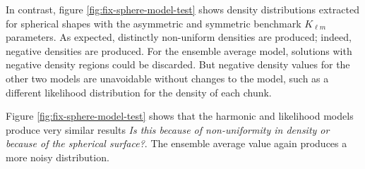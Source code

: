 \documentclass{aastex631}
\newcommand{\jtd}[1]{{\color{red}\textit{#1}}}
\begin{document}
In contrast, figure \ref{fig:fix-sphere-model-test} shows density distributions extracted for spherical shapes with the asymmetric and symmetric benchmark $K_{\ell m}$ parameters. As expected, distinctly non-uniform densities are produced; indeed, negative densities are produced. For the ensemble average model, solutions with negative density regions could be discarded. But negative density values for the other two models are unavoidable without changes to the model, such as a different likelihood distribution for the density of each chunk.

Figure \ref{fig:fix-sphere-model-test} shows that the harmonic and likelihood models produce very similar results \jtd{Is this because of non-uniformity in density or because of the spherical surface?}. The ensemble average value again produces a more noisy distribution.
\end{document}
